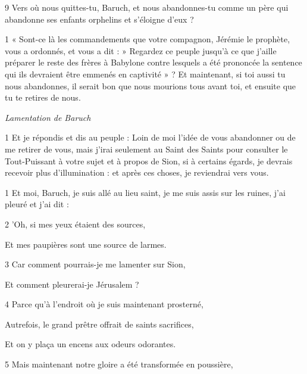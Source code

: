 \par 9 Vers où nous quittes-tu, Baruch, et nous abandonnes-tu comme un père qui abandonne ses enfants orphelins et s'éloigne d'eux ?


\par 1 « Sont-ce là les commandements que votre compagnon, Jérémie le prophète, vous a ordonnés, et vous a dit : » Regardez ce peuple jusqu'à ce que j'aille préparer le reste des frères à Babylone contre lesquels a été prononcée la sentence qui ils devraient être emmenés en captivité » ? Et maintenant, si toi aussi tu nous abandonnes, il serait bon que nous mourions tous avant toi, et ensuite que tu te retires de nous.


\par \textit{Lamentation de Baruch}

\par 1 Et je répondis et dis au peuple : Loin de moi l'idée de vous abandonner ou de me retirer de vous, mais j'irai seulement au Saint des Saints pour consulter le Tout-Puissant à votre sujet et à propos de Sion, si à certains égards, je devrais recevoir plus d'illumination : et après ces choses, je reviendrai vers vous.


\par 1 Et moi, Baruch, je suis allé au lieu saint, je me suis assis sur les ruines, j'ai pleuré et j'ai dit :

\par 2 'Oh, si mes yeux étaient des sources,

\par Et mes paupières sont une source de larmes.

\par 3 Car comment pourrais-je me lamenter sur Sion,

\par Et comment pleurerai-je Jérusalem ?

\par 4 Parce qu'à l'endroit où je suis maintenant prosterné,

\par Autrefois, le grand prêtre offrait de saints sacrifices,

\par Et on y plaça un encens aux odeurs odorantes.

\par 5 Mais maintenant notre gloire a été transformée en poussière,

